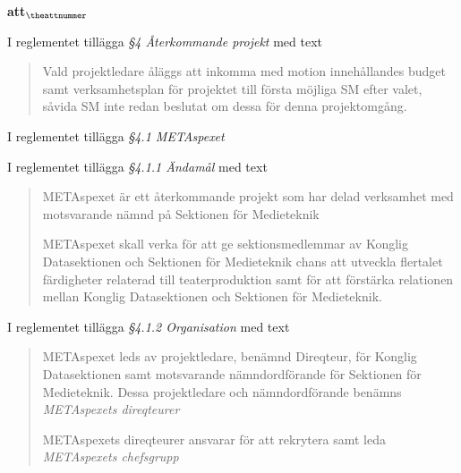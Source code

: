 \documentclass[a4paper]{article}
\begin{document}
\setcounter{attnummer}{1}
\begin{list}{\bf att$_{\theattnummer}$}{}


\item I reglementet tillägga \textit{\S4 Återkommande projekt} med text
    \begin{quote}
        Vald projektledare åläggs att inkomma med motion innehållandes budget samt verksamhetsplan för projektet till första möjliga SM efter valet, såvida SM inte redan beslutat om dessa för denna projektomgång.
    \end{quote}


\item I reglementet tillägga \textit{\S4.1 METAspexet}
\item I reglementet tillägga \textit{\S4.1.1 Ändamål} med text
    \begin{quote}
    METAspexet är ett återkommande projekt som har delad verksamhet med motsvarande nämnd på Sektionen för Medieteknik

    METAspexet skall verka för att ge sektionsmedlemmar av Konglig Datasektionen och Sektionen för Medieteknik chans att utveckla flertalet färdigheter relaterad till teaterproduktion samt för att förstärka relationen mellan Konglig Datasektionen och Sektionen för Medieteknik.
    \end{quote}
\item I reglementet tillägga \textit{\S4.1.2 Organisation} med text
    \begin{quote}
        METAspexet leds av projektledare, benämnd Direqteur, för Konglig Datasektionen samt motsvarande nämndordförande
        för Sektionen för Medieteknik. Dessa projektledare och nämndordförande benämns \textit{METAspexets direqteurer}

        METAspexets direqteurer ansvarar för att rekrytera samt leda \textit{METAspexets chefsgrupp}


\end{quote}
\end{list}
\end{document}
